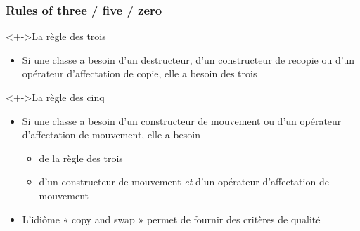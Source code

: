 \begin{frame}
\frametitle{Rules of three / five / zero}
\begin{exampleblock}<+->{La règle des trois}
	\begin{itemize}[<+->]
	\item Si une classe a besoin d'un destructeur, d'un constructeur de recopie ou d'un opérateur d'affectation de copie, elle a besoin des trois	
	\end{itemize}
\end{exampleblock}
\begin{exampleblock}<+->{La règle des cinq}
	\begin{itemize}[<+->]
	\item Si une classe a besoin d'un constructeur de mouvement ou d'un opérateur d'affectation de mouvement, elle a besoin
		\begin{itemize}
		\item de la règle des trois
		\item d'un constructeur de mouvement \emph{et} d'un opérateur d'affectation de mouvement
		\end{itemize}
	\end{itemize}
\end{exampleblock}
\begin{itemize}[<+->]
\item L'idiôme « copy and swap » permet de fournir des critères de qualité
\end{itemize}
\end{frame}

